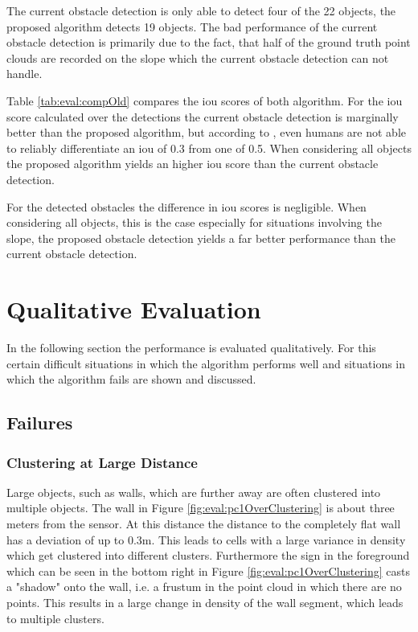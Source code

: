 The current obstacle detection is only able to detect four of the 22 objects, the proposed algorithm detects 19 objects. The bad performance of the current obstacle detection is primarily due to the fact, that half of the ground truth point clouds are recorded on the slope which the current obstacle detection can not handle.

Table \ref{tab:eval:compOld} compares the \ac{iou} scores of both algorithm. 
For the \ac{iou} score calculated over the detections the current obstacle detection is marginally better than the proposed algorithm, but according to \cite{ioumurks}, even humans are not able to reliably differentiate an \ac{iou} of 0.3 from one of 0.5.
When considering all objects the proposed algorithm yields an higher \ac{iou} score than the current obstacle detection.

For the detected obstacles the difference in \ac{iou} scores is negligible.
When considering all objects, this is the case especially for situations involving the slope, the proposed obstacle detection yields a far better performance than the current obstacle detection. 

\section{Qualitative Evaluation}
In the following section the performance is evaluated qualitatively. For this certain difficult situations in which the algorithm performs well and situations in which the algorithm fails are shown and discussed.

\subsection{Failures}
\subsubsection{Clustering at Large Distance}
Large objects, such as walls, which are further away are often clustered into multiple objects. The wall in Figure \ref{fig:eval:pc1OverClustering} is
about three meters from the sensor. At this distance the distance to the
completely flat wall has a deviation of up to 0.3m. This leads to cells with a large variance in density which get clustered into different clusters.
Furthermore the sign in the foreground which can be seen in the bottom right
in Figure \ref{fig:eval:pc1OverClustering} casts a "shadow" onto the wall,
i.e. a frustum in the point cloud in which there are no points. This results in
a large change in density of the wall segment, which leads to multiple clusters.

